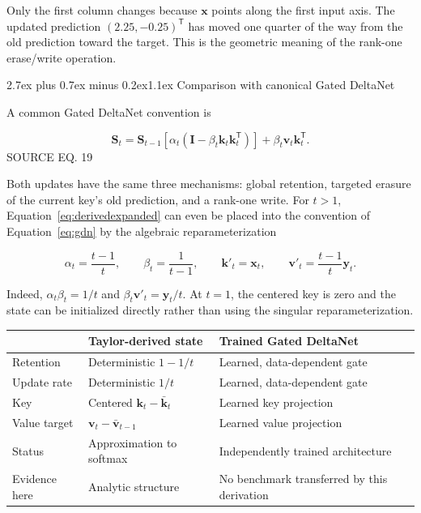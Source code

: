 \documentclass[11pt]{article}
\makeatletter
\newcommand{\vect}[1]{\bm{#1}}
\newcommand{\trans}{^{\mathsf T}}
\newcommand{\sourceeq}[1]{\hfill{\sffamily\scriptsize\color{Muted}SOURCE EQ. #1}}
\renewcommand\section{\@startsection{section}{1}{0pt}%
  {2.7ex plus 0.7ex minus 0.2ex}{1.1ex}%
  {\normalfont\sffamily\Large\bfseries\color{Ink}}}
\makeatother
\begin{document}
Only the first column changes because $\vect x$ points along the first input
axis. The updated prediction $(2.25,-0.25)\trans$ has moved one quarter of the
way from the old prediction toward the target. This is the geometric meaning of
the rank-one erase/write operation.

\section{Comparison with canonical Gated DeltaNet}

A common Gated DeltaNet convention is \cite{yang2024gated}

\begin{equation}
  \vect S_t
  =\vect S_{t-1}
    [\alpha_t(\vect I-\beta_t\vect k_t\vect k_t\trans)]
   +\beta_t\vect v_t\vect k_t\trans.
  \tag{19}\label{eq:gdn}
\end{equation}
\sourceeq{19}

Both updates have the same three mechanisms: global retention, targeted erasure
of the current key's old prediction, and a rank-one write. For $t>1$,
Equation~\eqref{eq:derivedexpanded} can even be placed into the convention of
Equation~\eqref{eq:gdn} by the algebraic reparameterization

\[
  \alpha_t=\frac{t-1}{t},\qquad
  \beta_t=\frac1{t-1},\qquad
  \vect k'_t=\vect x_t,\qquad
  \vect v'_t=\frac{t-1}{t}\vect y_t.
\]

Indeed, $\alpha_t\beta_t=1/t$ and
$\beta_t\vect v'_t=\vect y_t/t$. At $t=1$, the centered key is zero and the
state can be initialized directly rather than using the singular
reparameterization.

\begin{tabularx}{\textwidth}{@{}p{32mm}YY@{}}
\toprule
 & \textbf{Taylor-derived state} & \textbf{Trained Gated DeltaNet} \\
\midrule
Retention & Deterministic $1-1/t$ & Learned, data-dependent gate \\
Update rate & Deterministic $1/t$ & Learned, data-dependent gate \\
Key & Centered $\vect k_t-\bar{\vect k}_t$ & Learned key projection \\
Value target & $\vect v_t-\bar{\vect v}_{t-1}$ & Learned value projection \\
Status & Approximation to softmax & Independently trained architecture \\
Evidence here & Analytic structure & No benchmark transferred by this derivation \\
\bottomrule
\end{tabularx}
\end{document}
